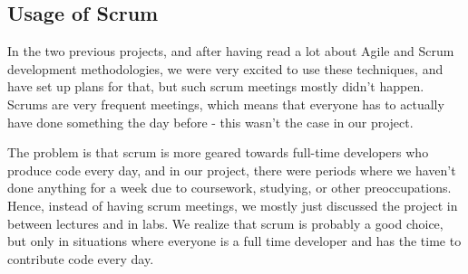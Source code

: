 \documentclass[a4paper,12pt]{article}
\begin{document}
		\subsection{Usage of Scrum}
		
		In the two previous projects, and after having read a lot about Agile and Scrum development methodologies, we were very excited to use these techniques, and have set up plans for that, but such scrum meetings mostly didn't happen. Scrums are very frequent meetings, which means that everyone has to actually have done something the day before - this wasn't the case in our project.
		
		The problem is that scrum is more geared towards full-time developers who produce code every day, and in our project, there were periods where we haven't done anything for a week due to coursework, studying, or other preoccupations. Hence, instead of having scrum meetings, we mostly just discussed the project in between lectures and in labs. We realize that scrum is probably a good choice, but only in situations where everyone is a full time developer and has the time to contribute code every day.
  
\end{document}
